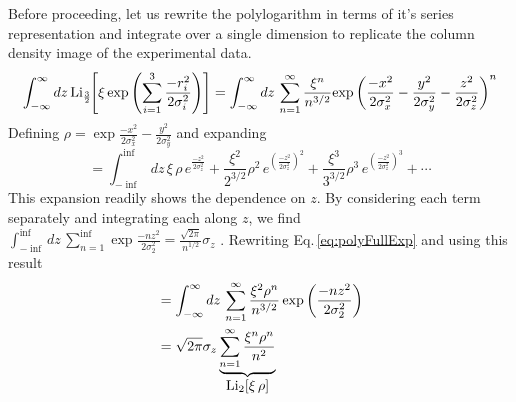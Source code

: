 Before proceeding, let us rewrite the polylogarithm in terms of it's series representation and integrate over a single dimension to replicate the column density image of the experimental data.
\begin{equation}
	\int_{-\infty}^{\infty} dz\,\text{Li}_{\scriptscriptstyle\frac{3}{2}\!}\!\left[ \xi \,\text{exp}\left( {\sum_{i=1}^3 \frac{-r_i^2}{2\sigma_i^2}} \right) \right] = 
	\int_{-\infty}^{\infty} dz\, \sum_{n=1}^{\infty} \frac{\xi^n}{n^{3/2}}\text{exp}\left( {\frac{-x^2}{2\sigma_x^2} - \frac{y^2}{2\sigma_y^2} - \frac{z^2}{2\sigma_z^2}} \right)^n
\end{equation}
Defining $\rho=\exp{\frac{-x^2}{2\sigma_x^2} - \frac{y^2}{2\sigma_y^2}}$ and expanding
\begin{equation} \label{eq:polyFullExp}
	=\int_{-\inf}^{\inf} dz\, \xi\,\rho\,e^{\frac{-z^2}{2\sigma_z^2}} + 
 \frac{\xi^2}{2^{3/2}}\rho^2\,e^{\left(\frac{-z^2}{2\sigma_z^2}\right)^2} + 
 \frac{\xi^3}{3^{3/2}}\rho^3\,e^{\left(\frac{-z^2}{2\sigma_z^2}\right)^3} + \cdots
\end{equation}
This expansion readily shows the dependence on $z$. 
By considering each term separately and integrating each along $z$, we find $\displaystyle\int_{-\inf}^{\inf} dz\, \sum_{n=1}^{\inf}\exp{\frac{-n z^2}{2\sigma_2^2}} = \frac{\sqrt{2\pi}}{n^{1/2}}\sigma_z$ \cite{Ketterle1999, Gotlibovych2014}.
Rewriting Eq.\,\ref{eq:polyFullExp} and using this result
\begingroup
\addtolength{\jot}{1em}
\begin{equation}
\begin{split}
	&=\int_{-\infty}^{\infty} dz\, \sum_{n=1}^{\infty}\frac{\xi^2\rho^n}{n^{3/2}}\,\text{exp}\left( {\frac{-n z^2}{2\sigma_2^2}} \right) \\
	&=\sqrt{2\pi}\sigma_z\underbrace{\sum_{n=1}^{\infty}\frac{\xi^n\rho^n}{n^2}}_{\displaystyle\text{Li}_{2}\!\left[ \xi\,\rho \right]}
\end{split}
\end{equation}
\endgroup

